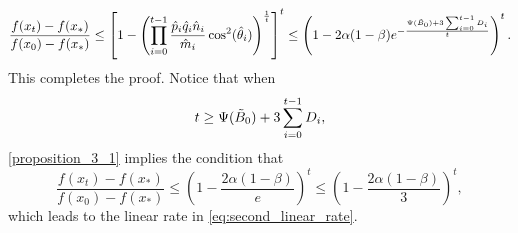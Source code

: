 \documentclass[11pt,letterpaper]{article}
\newcommand\0{{\Vector{0}}}
\newcommand\1{{\Vector{1}}}
\numberwithin{assumption}{section}
\numberwithin{definition}{section}
\numberwithin{theorem}{section}
\numberwithin{remark}{section}
\begin{document}
    \begin{align*}
        \frac{f(x_{t}) - f(x_*)}{f(x_0) - f(x_*)} \leq \left[1 - \left(\prod_{i = 0}^{t-1} \frac{\hat{p}_i\hat{q}_i\hat{n}_i}{\hat{m}_i} \cos^2(\hat{\theta}_i)\right)^{\frac{1}{t}}\right]^{t} \leq \left(1 - 2\alpha(1 - \beta)e^{- \frac{\Psi(\Tilde{B}_{0}) + 3\sum_{i = 0}^{t - 1}D_i}{t}} \right)^{t}.
    \end{align*}
    This completes the proof. Notice that when
    \begin{equation}
        t \geq \Psi(\Tilde{B}_{0}) + 3\sum_{i = 0}^{t - 1}D_i,
    \end{equation}
    \eqref{proposition_3_1} implies the condition that 
    \begin{equation}
        \frac{f(x_t) - f(x_*)}{f(x_0) - f(x_*)} \leq \left(1 -\frac{2\alpha(1 - \beta)}{e} \right)^{t}\leq \left(1 - \frac{2\alpha(1 - \beta)}{3} \right)^{t},
    \end{equation}
    which leads to the linear rate in \eqref{eq:second_linear_rate}. 
    
\end{document}
